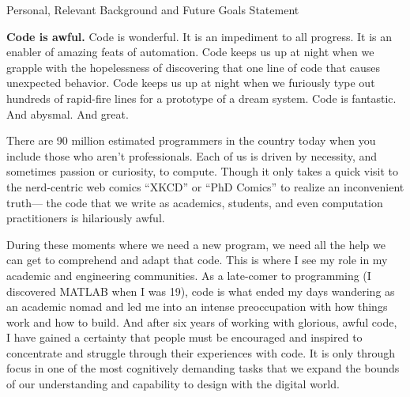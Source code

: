 \documentclass[12pt]{memoir}
\title{}
\author{Andrew Head}
\begin{document}
\begin{center}
Personal, Relevant Background and Future Goals Statement
\end{center}
\vspace{-1ex}



\textbf{Code is awful.}
Code is wonderful.
It is an impediment to all progress.
It is an enabler of amazing feats of automation.
Code keeps us up at night when we grapple with the hopelessness of discovering that one line of code that causes unexpected behavior.
Code keeps us up at night when we furiously type out hundreds of rapid-fire lines for a prototype of a dream system.
Code is fantastic.
And abysmal.
And great.

There are 90 million estimated programmers in the country today when you include those who aren't professionals.
Each of us is driven by necessity, and sometimes passion or curiosity, to compute.
Though it only takes a quick visit to the nerd-centric web comics ``XKCD'' or ``PhD Comics'' to realize an inconvenient truth---
the code that we write as academics, students, and even computation practitioners is hilariously awful.

During these moments where we need a new program, we need all the help we can get to comprehend and adapt that code.
This is where I see my role in my academic and engineering communities.
As a late-comer to programming (I discovered MATLAB when I was 19), code is what ended my days wandering as an academic nomad and led me into an intense preoccupation with how things work and how to build.
And after six years of working with glorious, awful code, I have gained a certainty that people must be encouraged and inspired to concentrate and struggle through their experiences with code.
It is only through focus in one of the most cognitively demanding tasks that we expand the bounds of our understanding and capability to design with the digital world.
\end{document}
